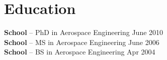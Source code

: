\documentclass[11pt]{article}       %
\begin{document}

\vspace{-18.5pt}

\section*{Education}
\textbf{School} -- PhD in Aerospace Engineering \hfill June 2010 \\
\textbf{School} -- MS in Aerospace Engineering \hfill June 2006 \\
\textbf{School} -- BS in Aerospace Engineering \hfill Apr 2004
\end{document}
